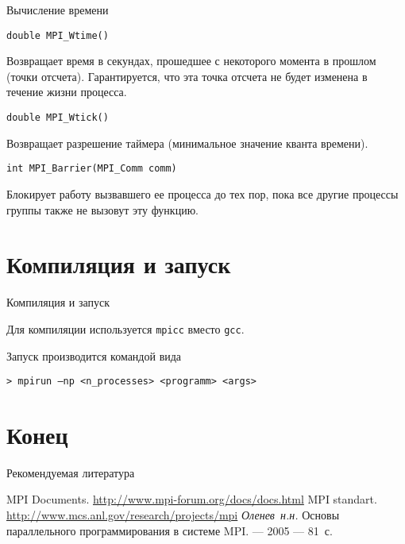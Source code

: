 \begin{frame}[fragile]{Вычисление времени}

\begin{lstlisting}
double MPI_Wtime()
\end{lstlisting}

Возвращает время в секундах, прошедшее с  некоторого момента в прошлом (точки отсчета). Гарантируется, что эта точка отсчета не будет изменена в течение жизни процесса.

\begin{lstlisting}
double MPI_Wtick()
\end{lstlisting}

Возвращает разрешение таймера (минимальное значение кванта времени).

\begin{lstlisting}
int MPI_Barrier(MPI_Comm comm)
\end{lstlisting}

Блокирует работу вызвавшего ее процесса до тех пор, пока все другие процессы группы также не вызовут эту функцию.

\end{frame}

\section{Компиляция и запуск}

\begin{frame}[fragile]{Компиляция и запуск}

Для компиляции используется \texttt{mpicc} вместо \texttt{gcc}.

\vfill

Запуск производится командой вида

\begin{lstlisting}
> mpirun –np <n_processes> <programm> <args>
\end{lstlisting}

\end{frame}

\section*{Конец}

\begin{frame}[allowframebreaks]{Рекомендуемая литература}
\begin{thebibliography}{99}
    \bibitem{} MPI Documents. \url{http://www.mpi-forum.org/docs/docs.html}
    \bibitem{} MPI standart. \url{http://www.mcs.anl.gov/research/projects/mpi}
    \bibitem{} \textit{Оленев~н.н.} Основы параллельного программирования в
    системе MPI. --- 2005 --- 81~с.
\end{thebibliography}
\end{frame}

